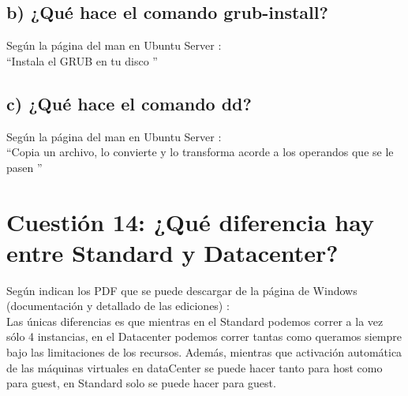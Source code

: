 \subsection{b) ¿Qué hace el comando grub-install?}
Según la página del man en Ubuntu Server \cite{grub-install}:\\
\textquotedblleft Instala el GRUB en tu disco \textquotedblright
\subsection{c) ¿Qué hace el comando dd?}
Según la página del man en Ubuntu Server \cite{dd}:\\
\textquotedblleft Copia un archivo, lo convierte y lo transforma acorde a los operandos que se le pasen \textquotedblright
\section{Cuestión 14: ¿Qué diferencia hay entre Standard y Datacenter?}
Según indican los PDF que se puede descargar de la página de Windows (documentación y detallado de las ediciones) \cite{datacentervsstandar} \cite{datacentervsstandar2}:\\
Las únicas diferencias es que mientras en el Standard podemos correr a la vez sólo 4 instancias, en el Datacenter podemos correr tantas como queramos siempre bajo las limitaciones de los recursos. Además, mientras que activación automática de las máquinas virtuales en dataCenter se puede hacer tanto para host como para guest, en Standard solo se puede hacer para guest.

